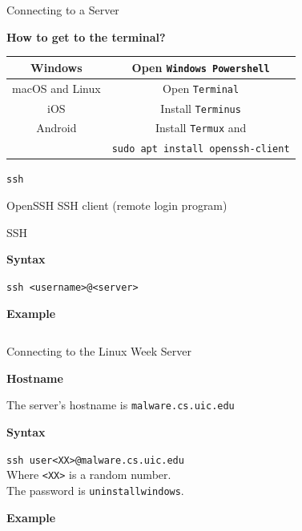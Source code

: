 \documentclass{beamer}
\begin{document}
\begin{frame}{Connecting to a Server}
	\begin{Large}
		\textbf{How to get to the terminal?} \\
	\end{Large}
	\begin{tabular}{|c|c|}
		\hline
		Windows & Open \texttt{Windows Powershell} \\
		\hline
		macOS and Linux & Open \texttt{Terminal} \\
		\hline
		iOS & Install \texttt{Terminus} \\
		\hline
		Android & Install \texttt{Termux} and \\
		& \texttt{sudo apt install openssh-client} \\
		\hline
	\end{tabular}
\end{frame}

\begin{frame}
	\begin{center}
		\begin{Huge}
			\texttt{ssh} \\
		\end{Huge}
		OpenSSH SSH client (remote login program)
	\end{center}
\end{frame}

\begin{frame}{SSH}
	\begin{Large}
		\textbf{Syntax} \\
	\end{Large}
	\texttt{ssh <username>@<server>}

	\vspace{0.3cm}

	\begin{Large}
		\textbf{Example} \\
	\end{Large}
	\inputminted{shell-session}{ssh.txt}
\end{frame}

\begin{frame}{Connecting to the Linux Week Server}
	\begin{Large}
		\textbf{Hostname} \\
	\end{Large}
	The server's hostname is \texttt{malware.cs.uic.edu}

	\vspace{0.3cm}

	\begin{Large}
		\textbf{Syntax} \\
	\end{Large}
	\texttt{ssh user<XX>@malware.cs.uic.edu} \\
	Where \texttt{<XX>} is a random number. \\
	The password is \texttt{uninstallwindows}.

	\vspace{0.3cm}

	\begin{Large}
		\textbf{Example} \\
	\end{Large}
	\inputminted{shell-session}{ssh-conn.txt}
\end{frame}
\end{document}
